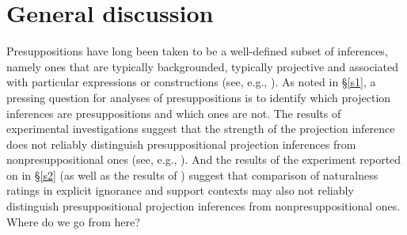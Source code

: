 \documentclass[11pt,fleqn]{article}
\newcommand{\6}{\mbox{$[\hspace*{-.6mm}[$}}
\newcommand{\9}{\mbox{$]\hspace*{-.6mm}]$}}
\begin{document}

  
\section{General discussion}\label{s3}

Presuppositions have long been taken to be a well-defined subset of inferences, namely ones that are typically backgrounded, typically projective and associated with particular expressions or constructions (see, e.g., \citealt{heim83,vds92,potts05,presupposition-sep}). As noted in \S\ref{s1}, a pressing question for analyses of presuppositions is to identify which projection inferences are presuppositions and which ones are not. The results of experimental investigations suggest that the strength of the projection inference does not reliably distinguish presuppositional projection inferences from nonpresuppositional ones (see, e.g., \citealt{demarneffe-etal-sub23,tbd-variability,degen-tonhauser-language}). And the results of the experiment reported on in \S\ref{s2} (as well as the results of \citealt[Exp.~1]{kalomoiros-schwarz2024}) suggest that comparison of naturalness ratings in explicit ignorance and support contexts may also not reliably distinguish presuppositional projection inferences from nonpresuppositional ones. Where do we go from here?
\end{document}
